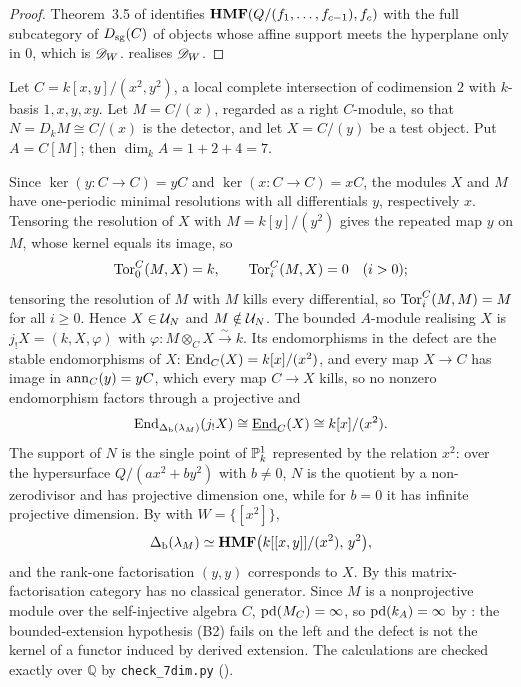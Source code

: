 \begin{proof}
Theorem~3.5 of \cite{BerghJorgensenMF} identifies \(\operatorname{\mathbf{HMF}}(Q/(f_1,\dots,f_{c-1}),f_c)\) with the full subcategory of \(D_{\mathrm{sg}}(C)\) of objects whose affine support meets the hyperplane only in \(0\), which is \(\mathscr D_W\).   realises \(\mathscr D_W\).
\end{proof}

\begin{example}\label{ex:seven}
Let \(C=k[x,y]/(x^2,y^2)\), a local complete intersection of codimension \(2\) with \(k\)-basis \(1,x,y,xy\).  Let \(M=C/(x)\), regarded as a right \(C\)-module, so that \(N=D_kM\cong C/(x)\) is the detector, and let \(X=C/(y)\) be a test object.  Put \(A=C[M]\); then \(\dim_kA=1+2+4=7\).

Since \(\ker(y\colon C\to C)=yC\) and \(\ker(x\colon C\to C)=xC\), the modules \(X\) and \(M\) have one-periodic minimal resolutions with all differentials \(y\), respectively \(x\).  Tensoring the resolution of \(X\) with \(M=k[y]/(y^2)\) gives the repeated map \(y\) on \(M\), whose kernel equals its image, so
\[
 \operatorname{Tor}_0^C(M,X)=k,\qquad\operatorname{Tor}^C_i(M,X)=0\quad(i>0);
\]
tensoring the resolution of \(M\) with \(M\) kills every differential, so \(\operatorname{Tor}_i^C(M,M)=M\) for all \(i\ge0\).  Hence \(X\in\mathcal U_N\) and \(M\notin\mathcal U_N\).  The bounded \(A\)-module realising \(X\) is \(j_!X=(k,X,\varphi)\) with \(\varphi:M\otimes_CX\xrightarrow{\sim}k\).  Its endomorphisms in the defect are the stable endomorphisms of \(X\): \(\operatorname{End}_C(X)=k[x]/(x^2)\), and every map \(X\to C\) has image in \(\operatorname{ann}_C(y)=yC\), which every map \(C\to X\) kills, so no nonzero endomorphism factors through a projective and
\[
 \operatorname{End}_{\Delta_{\mathrm b}(\lambda_M)}(j_!X)\cong\underline{\operatorname{End}}_C(X)\cong k[x]/(x^2).
\]
The support of \(N\) is the single point of \(\mathbb P^1_k\) represented by the relation \(x^2\): over the hypersurface \(Q/(ax^2+by^2)\) with \(b\ne0\), \(N\) is the quotient by a non-zerodivisor and has projective dimension one, while for \(b=0\) it has infinite projective dimension.  By  with \(W=\{[x^2]\}\),
\[
 \Delta_{\mathrm b}(\lambda_M)\simeq\operatorname{\mathbf{HMF}}\bigl(k[[x,y]]/(x^2),\,y^2\bigr),
\]
and the rank-one factorisation \((y,y)\) corresponds to \(X\).  By  this matrix-factorisation category has no classical generator.  Since \(M\) is a nonprojective module over the self-injective algebra \(C\), \(\operatorname{pd}(M_C)=\infty\), so \(\operatorname{pd}(k_A)=\infty\) by : the bounded-extension hypothesis (B2) fails on the left and the defect is not the kernel of a functor induced by derived extension.  The calculations are checked exactly over \(\mathbb Q\) by \texttt{check\_7dim.py} ().
\end{example}

